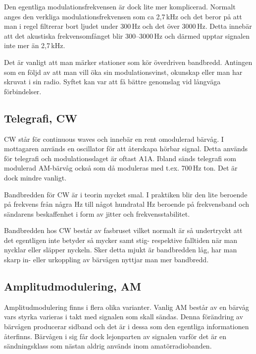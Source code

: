 Den egentliga modulationsfrekvensen är dock lite mer komplicerad. Normalt
anges den verkliga modulationsfrekvensen som ca 2,7\,kHz och det beror på att
man i regel filtrerar bort ljudet under 300\,Hz och det över 3000\,Hz. Detta
innebär att det akustiska frekvensomfånget blir 300--3000\,Hz och därmed
upptar signalen inte mer än 2,7\,kHz.

Det är vanligt att man märker stationer som kör överdriven bandbredd. Antingen
som en följd av att man vill öka sin modulationsvinst, okunskap eller man har
skruvat i sin radio. Syftet kan var att få bättre genomslag vid långväga
förbindelser.

\subsection{Telegrafi, CW}

CW står för continuous waves och innebär en rent omodulerad bärvåg. I
mottagaren används en oscillator för att återskapa hörbar signal. Detta
används för telegrafi och modulationsslaget är oftast A1A. Ibland sänds
telegrafi som modulerad AM-bärvåg också som då moduleras med t.ex. 700\,Hz
ton. Det är dock mindre vanligt.

Bandbredden för CW är i teorin mycket smal. I praktiken blir den lite beroende
på frekvens från några Hz till något hundratal Hz beroende på frekvensband och
sändarens beskaffenhet i form av jitter och frekvensstabilitet.

Bandbredden hos CW består av fasbruset vilket normalt är så undertryckt att det
egentligen inte betyder så mycker samt stig- respektive falltiden när man
nycklar eller släpper nyckeln. Sker detta mjukt är bandbredden låg, har man
skarp in- eller urkoppling av bärvågen nyttjar man mer bandbredd.

\subsection{Amplitudmodulering, AM}

Amplitudmodulering finns i flera olika varianter. Vanlig AM består av en
bärvåg vars styrka varieras i takt med signalen som skall sändas. Denna
förändring av bärvågen producerar sidband och det är i dessa som den egentliga
informationen återfinns. Bärvågen i sig får dock lejonparten av signalen
varför det är en sändningsklass som nästan aldrig används inom
amatörradiobanden.

